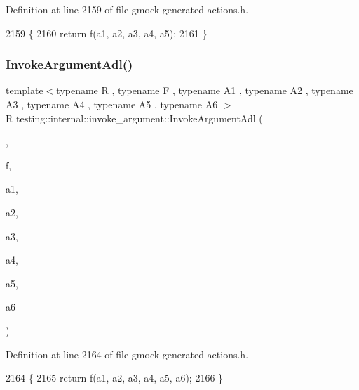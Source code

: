 Definition at line 2159 of file gmock-\/generated-\/actions.\+h.


\begin{DoxyCode}
2159                                                                     \{
2160   \textcolor{keywordflow}{return} f(a1, a2, a3, a4, a5);
2161 \}
\end{DoxyCode}
\mbox{\label{namespacetesting_1_1internal_1_1invoke__argument_a16bf1b90d183210a82fbbef4e2eef1c5}} 
\subsubsection{\texorpdfstring{Invoke\+Argument\+Adl()}{InvokeArgumentAdl()}\hspace{0.1cm}{\footnotesize\ttfamily [7/11]}}
{\footnotesize\ttfamily template$<$typename R , typename F , typename A1 , typename A2 , typename A3 , typename A4 , typename A5 , typename A6 $>$ \\
R testing\+::internal\+::invoke\+\_\+argument\+::\+Invoke\+Argument\+Adl (\begin{DoxyParamCaption}\item[{\hyperlink{structtesting_1_1internal_1_1invoke__argument_1_1AdlTag}{Adl\+Tag}}]{,  }\item[{F}]{f,  }\item[{A1}]{a1,  }\item[{A2}]{a2,  }\item[{A3}]{a3,  }\item[{A4}]{a4,  }\item[{A5}]{a5,  }\item[{A6}]{a6 }\end{DoxyParamCaption})}



Definition at line 2164 of file gmock-\/generated-\/actions.\+h.


\begin{DoxyCode}
2164                                                                            \{
2165   \textcolor{keywordflow}{return} f(a1, a2, a3, a4, a5, a6);
2166 \}
\end{DoxyCode}
\mbox{\label{namespacetesting_1_1internal_1_1invoke__argument_a77f581ed8b270ed4752d49d5bdd59e84}} 
